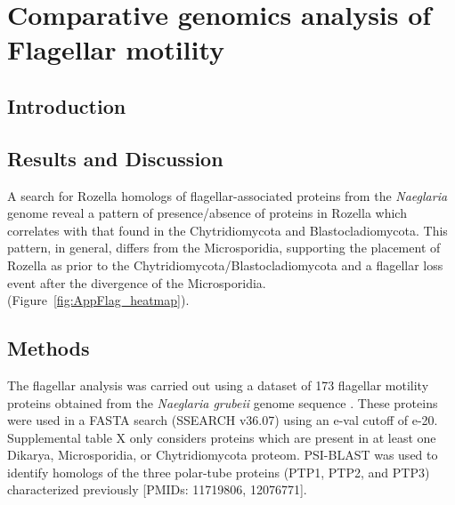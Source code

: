 \chapter{Comparative genomics analysis of Flagellar motility}
\label{app:Flagella}
\section{Introduction}
\section{Results and Discussion}
A search for Rozella homologs of flagellar-associated proteins from the \textit{Naeglaria} genome \cite{FritzLaylin2011} reveal a pattern of presence/absence of proteins in Rozella which correlates with that found in the Chytridiomycota and Blastocladiomycota. This pattern, in general, differs from the Microsporidia, supporting the placement of Rozella as prior to the Chytridiomycota/Blastocladiomycota and a flagellar loss event after the divergence of the Microsporidia. \\
\indent (Figure~\ref{fig:AppFlag_heatmap}).\\
\section{Methods}
The flagellar analysis was carried out using a dataset of 173 flagellar motility proteins obtained from the \textit{Naeglaria grubeii} genome sequence \cite{FritzLaylin2011}. These proteins were used in a FASTA search (SSEARCH v36.07) using an e-val cutoff of e-20. Supplemental table X only considers proteins which are present in at least one Dikarya, Microsporidia, or Chytridiomycota proteom. PSI-BLAST \cite{Altschul1997} was used to identify homologs of the three polar-tube proteins (PTP1, PTP2, and PTP3) characterized previously [PMIDs: 11719806, 12076771].\\

